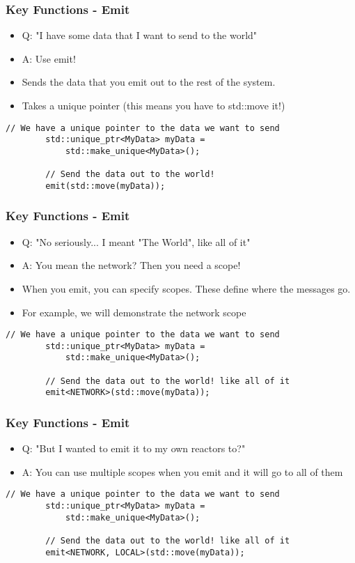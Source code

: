\documentclass{beamer}
\begin{document}
\begin{frame}[fragile]
	\frametitle{Key Functions - Emit}
	\begin{itemize}
		\item Q: "I have some data that I want to send to the world"
		\item A: Use emit!
		\item Sends the data that you emit out to the rest of the system.
		\item Takes a unique pointer (this means you have to std::move it!)
	\end{itemize}

	\begin{lstlisting}[language=nuclear]
		// We have a unique pointer to the data we want to send
		std::unique_ptr<MyData> myData =
		    std::make_unique<MyData>();

		// Send the data out to the world!
		emit(std::move(myData));
	\end{lstlisting}
\end{frame}

\begin{frame}[fragile]
	\frametitle{Key Functions - Emit}
	\begin{itemize}
		\item Q: "No seriously... I meant "The World", like all of it"
		\item A: You mean the network? Then you need a scope!
		\item When you emit, you can specify scopes. These define where the messages go.
		\item For example, we will demonstrate the network scope
	\end{itemize}

	\begin{lstlisting}[language=nuclear]
		// We have a unique pointer to the data we want to send
		std::unique_ptr<MyData> myData =
		    std::make_unique<MyData>();

		// Send the data out to the world! like all of it
		emit<NETWORK>(std::move(myData));
	\end{lstlisting}
\end{frame}

\begin{frame}[fragile]
	\frametitle{Key Functions - Emit}
	\begin{itemize}
		\item Q: "But I wanted to emit it to my own reactors to?"
		\item A: You can use multiple scopes when you emit and it will go to all of them
	\end{itemize}

	\begin{lstlisting}[language=nuclear]
		// We have a unique pointer to the data we want to send
		std::unique_ptr<MyData> myData =
		    std::make_unique<MyData>();

		// Send the data out to the world! like all of it
		emit<NETWORK, LOCAL>(std::move(myData));
	\end{lstlisting}
\end{frame}
\end{document}
